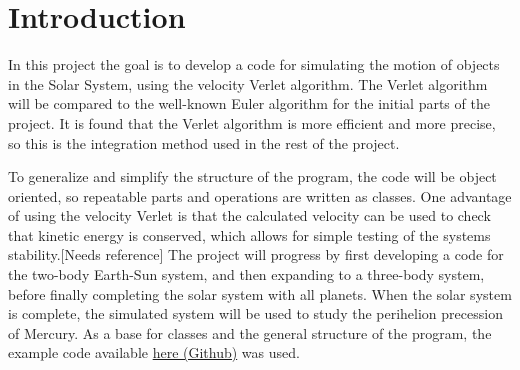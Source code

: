 \section{Introduction}
In this project the goal is to develop a code for simulating the motion of objects in the Solar System, using the velocity
Verlet algorithm. The Verlet algorithm will be compared to the well-known Euler algorithm for the
initial parts of the project. It is found that the Verlet algorithm is more efficient and more precise, so this is the integration method used in the rest of the project.  

To generalize and simplify the structure of the program, 
the code will be object oriented, so repeatable parts and operations are written as classes.
One advantage of using the velocity Verlet is that the calculated velocity can be used to check
that kinetic energy is conserved, which allows for simple testing of the systems stability.[Needs reference]
The project will progress by first developing a code for the two-body Earth-Sun system, and then
expanding to a three-body system, before finally completing the solar system with all planets.
When the solar system is complete, the simulated system will be used to study the perihelion
precession of Mercury.
\newline
As a base for classes and the general structure of the program, the example code available
\href{https://github.com/andeplane/solar-system}{here (Github)} was used.
